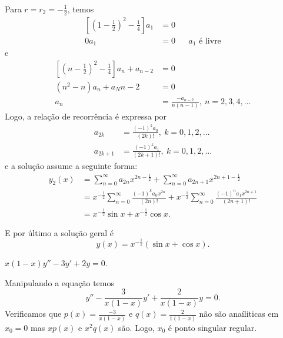 \documentclass[a4paper,12pt, leqno, answers]{exam}
\begin{document}
\begin{questions}
\begin{solution}
        Para $r = r_2 = -\frac{1}{2}$, temos
        \begin{align*}
            \left[ \left( 1 - \frac{1}{2} \right)^2 - \frac{1}{4} \right] a_1 &= 0 \\
            0 a_1 &= 0 && \text{$a_1$ \'{e} livre}
        \end{align*}
        e
        \begin{align*}
            \left[ \left( n - \frac{1}{2} \right)^2 - \frac{1}{4} \right] a_n + a_{n - 2} &= 0 \\
            \left( n^2 - n \right) a_n + a_N{n - 2} &= 0 \\
            a_n &= \frac{- a_{n - 2}}{n \left( n - 1 \right)}, \ n = 2, 3, 4, \ldots
        \end{align*}
        Logo, a rela\c{c}\~{a}o de recorr\^{e}ncia \'{e} expressa por
        \begin{align*}
            a_{2k} &= \frac{\left( -1 \right)^k a_0}{\left( 2k \right)!}, \ k = 0, 1, 2, \ldots \\
            a_{2k + 1} &= \frac{\left( -1 \right)^k a_1}{\left( 2k + 1 \right)!}, \ k = 0, 1, 2, \ldots
        \end{align*}
        e a solu\c{c}\~{a}o assume a seguinte forma:
        \begin{align*}
            y_2\left( x \right) &= \sum_{n = 0}^\infty a_{2n} x^{2n - \frac{1}{2}} + \sum_{n = 0}^\infty a_{2n + 1} x^{2n + 1 - \frac{1}{2}} \\
            &= x^{- \frac{1}{2}} \sum_{n = 0}^\infty \frac{\left( -1 \right)^k a_0 x^{2n}}{\left( 2 n \right)!} + x^{- \frac{1}{2}} \sum_{n = 0}^\infty \frac{\left( -1 \right)^n a_1 x^{2n + 1}}{\left( 2 n + 1 \right)!} \\
            &= x^{- \frac{1}{2}} \sin x + x^{- \frac{1}{2}} \cos x.
        \end{align*}

        E por último a solu\c{c}\~{a}o geral \'{e}
        \[
        y\left( x \right) = x^{- \frac{1}{2}} \left( \sin x + \cos x \right).
        \]
    \end{solution}

    \question $x\left( 1 - x \right) y'' - 3 y' + 2y = 0$.
    \begin{solution}
        Manipulando a equa\c{c}\~{a}o temos
        \[
        y'' - \frac{3}{x \left( 1 - x \right)} y' + \frac{2}{x \left( 1 - x \right)} y = 0.
        \]
        Verificamos que $p(x) = \frac{-3}{x \left( 1 - x \right)}$ e $q(x) = \frac{2}{1 \left( 1 - x \right)}$ n\~{a}o s\~{a}o ana\'{i}liticas em $x_0 = 0$ mas $x p(x)$ e $x^2 q(x)$ s\~{a}o. Logo, $x_0$ \'{e} ponto singular regular.


\end{solution}
\end{questions}
\end{document}
